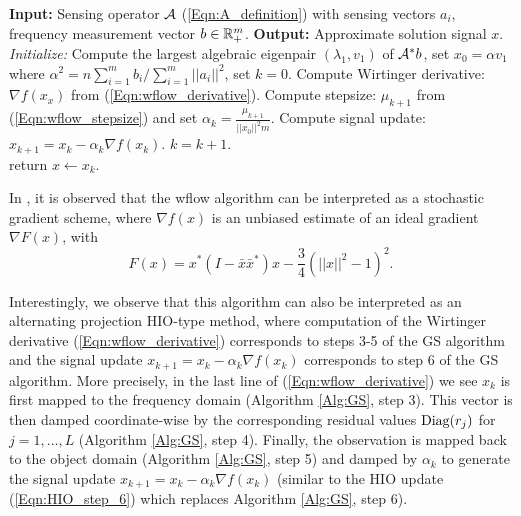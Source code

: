 \begin{enumerate}
\begin{algorithm}[H]
\begin{algorithmic}[1]
	\Statex 	\textbf{Input:} Sensing operator ${\mathcal A}$ (\ref{Eqn:A_definition}) with sensing vectors $a_i$, frequency measurement vector $b \in {\mathbb R}^m_+$.
	\Statex 	\textbf{Output:} Approximate solution signal $x$.
	\State 		\textit{Initialize:} Compute the largest algebraic eigenpair $(\lambda_1, v_1)$ of ${\mathcal A}^*b$, set $x_0 = \alpha v_1$ where $\alpha^2 =  n \sum_{i=1}^mb_i / \sum_{i=1}^m ||a_i||^2$, set $k = 0$.
		\State	Compute Wirtinger derivative: $\nabla f(x_x)$ from (\ref{Eqn:wflow_derivative}).
		\State	Compute stepsize: $\mu_{k+1}$ from (\ref{Eqn:wflow_stepsize}) and set $\alpha_k = \frac{\mu_{k+1}}{||x_0||^2 m}$.
		\State 	Compute signal update: $x_{k+1} = x_k - \alpha_k \nabla f(x_k)$.
		\State	$k = k + 1$.
	\EndWhile	\\
	return $x \leftarrow x_k$.
\end{algorithmic}
\end{algorithm}


In \cite[Section 2.3]{DBLP:journals/tit/CandesLS15}, it is observed that the wflow algorithm can be interpreted as a stochastic gradient scheme, where $\nabla f(x)$ is an unbiased estimate of an ideal gradient $\nabla F(x)$, with
\begin{equation}
F(x) = x^* \left( I - \bar{x}\bar{x}^* \right) x - \frac{3}{4} \left( ||x||^2 - 1\right)^2.
\end{equation}

Interestingly, we observe that this algorithm can also be interpreted as an alternating projection HIO-type method, where computation of the Wirtinger derivative (\ref{Eqn:wflow_derivative}) corresponds to steps 3-5 of the GS algorithm and the signal update $x_{k+1} = x_k - \alpha_k \nabla f(x_k)$ corresponds to step 6 of the GS algorithm.  More precisely, in the last line of (\ref{Eqn:wflow_derivative}) we see $x_k$ is first mapped to the frequency domain (Algorithm \ref{Alg:GS}, step 3).  This vector is then damped coordinate-wise by the corresponding residual values $\textnormal{Diag}(r_j)$ for $j = 1, \ldots, L$  (Algorithm \ref{Alg:GS}, step 4).  Finally, the observation is mapped back to the object domain (Algorithm \ref{Alg:GS}, step 5) and damped by $\alpha_k$ to generate the signal update $x_{k+1} = x_k - \alpha_k \nabla f(x_k)$ (similar to the HIO update (\ref{Eqn:HIO_step_6}) which replaces Algorithm \ref{Alg:GS}, step 6).  


\end{enumerate}
